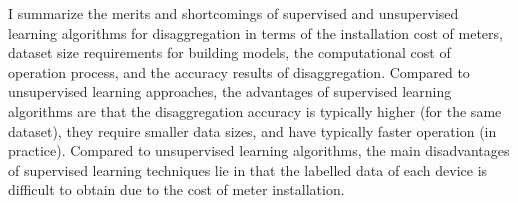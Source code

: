 I summarize the merits and shortcomings of supervised and 
unsupervised learning algorithms for disaggregation in terms of the installation cost of meters, dataset size requirements for building models, 
the computational cost of operation process, and the accuracy results of disaggregation. 
Compared to unsupervised learning approaches, the advantages of supervised learning algorithms are that the disaggregation accuracy is typically
higher (for the same dataset), they require smaller data sizes, and
have typically faster operation (in practice).
Compared to unsupervised learning algorithms, the main disadvantages of supervised learning techniques lie in that the labelled data of each device is difficult to obtain due to the cost of meter installation.




%
%

